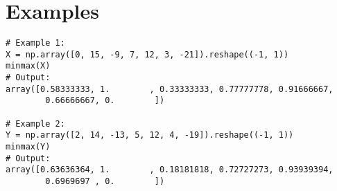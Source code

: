 \section*{Examples}
\begin{verbatim}
# Example 1:
X = np.array([0, 15, -9, 7, 12, 3, -21]).reshape((-1, 1))
minmax(X)
# Output:
array([0.58333333, 1.        , 0.33333333, 0.77777778, 0.91666667,
		0.66666667, 0.        ])

# Example 2:
Y = np.array([2, 14, -13, 5, 12, 4, -19]).reshape((-1, 1))
minmax(Y)
# Output:
array([0.63636364, 1.        , 0.18181818, 0.72727273, 0.93939394,
		0.6969697 , 0.        ])
\end{verbatim}